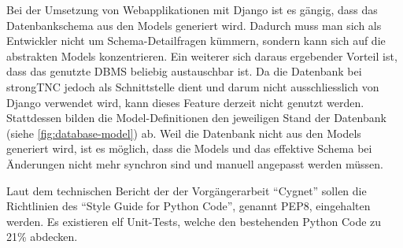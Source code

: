 Bei der Umsetzung von Webapplikationen mit Django ist es gängig, dass das
Datenbankschema aus den Models generiert wird. Dadurch muss man sich als
Entwickler nicht um Schema-Detailfragen kümmern, sondern kann sich auf die
abstrakten Models konzentrieren. Ein weiterer sich daraus ergebender Vorteil ist,
dass das genutzte DBMS beliebig austauschbar ist. Da die Datenbank bei strongTNC
jedoch als Schnittstelle dient und darum nicht ausschliesslich von Django
verwendet wird, kann dieses Feature derzeit nicht genutzt werden. Stattdessen
bilden die Model-Definitionen den jeweiligen Stand der Datenbank (siehe
\autoref{fig:database-model}) ab. Weil die Datenbank nicht aus den Models
generiert wird, ist es möglich, dass die Models und das effektive Schema bei
Änderungen nicht mehr synchron sind und manuell angepasst werden müssen.

Laut dem technischen Bericht der der Vorgängerarbeit
\enquote{Cygnet}\cite{cygnet:2013} sollen die Richtlinien des \enquote{Style
Guide for Python Code}\cite{PEP8:2001}, genannt PEP8, eingehalten werden. Es
existieren elf Unit-Tests, welche den bestehenden Python Code zu 21\% abdecken.

